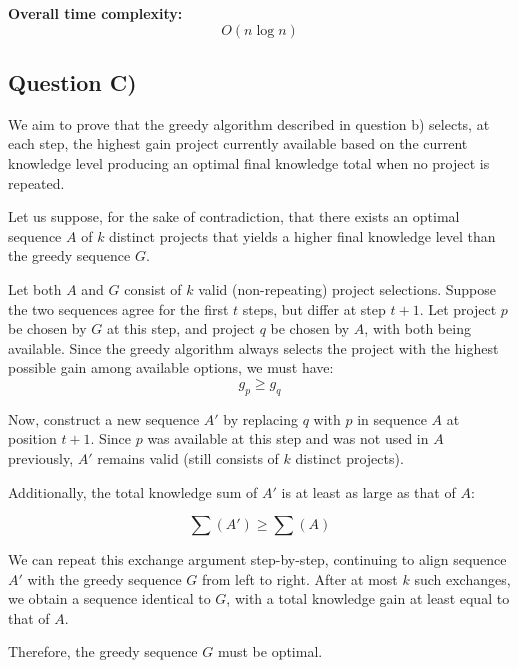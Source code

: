\documentclass[12pt]{article}
\begin{document}
\textbf{Overall time complexity:}
\[
\boxed{O(n \log n)}
\]

\newpage
\subsection*{Question C)}

We aim to prove that the greedy algorithm described in question b) selects, at each step, the highest gain project currently available based on the current knowledge level producing an optimal final knowledge total when no project is repeated.

Let us suppose, for the sake of contradiction, that there exists an optimal sequence $A$ of $k$ distinct projects that yields a higher final knowledge level than the greedy sequence $G$.

Let both $A$ and $G$ consist of $k$ valid (non-repeating) project selections. Suppose the two sequences agree for the first $t$ steps, but differ at step $t+1$. Let project $p$ be chosen by $G$ at this step, and project $q$ be chosen by $A$, with both being available. Since the greedy algorithm always selects the project with the highest possible gain among available options, we must have:
\[
g_p \geq g_q
\]

Now, construct a new sequence $A'$ by replacing $q$ with $p$ in sequence $A$ at position $t+1$. Since $p$ was available at this step and was not used in $A$ previously, $A'$ remains valid (still consists of $k$ distinct projects).

Additionally, the total knowledge sum of $A'$ is at least as large as that of $A$:

\[
\boxed{\sum(A') \geq \sum(A)}
\]

We can repeat this exchange argument step-by-step, continuing to align sequence $A'$ with the greedy sequence $G$ from left to right. After at most $k$ such exchanges, we obtain a sequence identical to $G$, with a total knowledge gain at least equal to that of $A$.

Therefore, the greedy sequence $G$ must be optimal.
\end{document}
